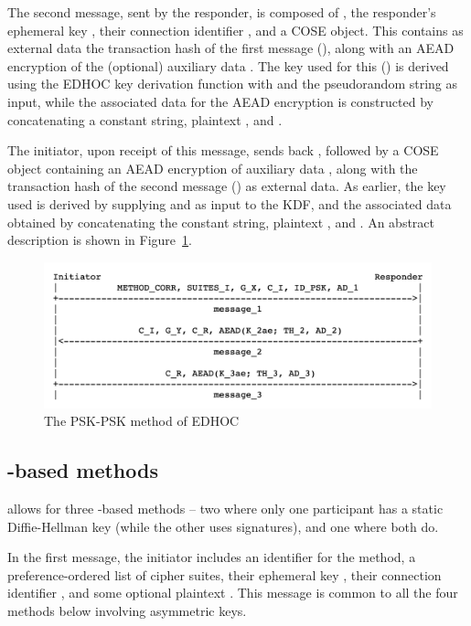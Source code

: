The second message, sent by the responder, is composed of \mCi, the responder's ephemeral key \mGy, their connection identifier \mCr, and a COSE object. This contains as external data the transaction hash of the first message (\mTHtwo), along with an AEAD encryption of the (optional) auxiliary data \mADtwo. The key used for this (\mKtwo) is derived using the EDHOC key derivation function with \mTHtwo and the pseudorandom string \mPRKtwo as input, while the associated data for the AEAD encryption is constructed by concatenating a constant string, plaintext \mhplain, and \mTHtwo. 

The initiator, upon receipt of this message, sends back \mCr, followed by a COSE object containing an AEAD encryption of auxiliary data \mADthree, along with the transaction hash of the second message (\mTHthree) as external data. As earlier, the key used is derived by supplying \mTHthree and \mPRKthree as input to the KDF, and the associated data obtained by concatenating the constant string, plaintext \mhplain, and \mTHthree. An abstract description is shown in Figure~\ref{fig:edhocpsk}.


\begin{figure}[!h]\label{fig:edhocpsk}
\centering
\includegraphics[scale=0.3]{Images/psk.png}
\caption{The PSK-PSK method of EDHOC}
\end{figure}

\subsection{\mStat-based methods}
\mEdhoc allows for three \mStat-based methods -- two where only one participant has a static Diffie-Hellman key (while the other uses signatures), and one where both do. 

In the first message, the initiator includes an identifier for the method, a preference-ordered list of cipher suites, their ephemeral key \mGx, their connection identifier \mCi, and some optional plaintext \mADone. This message is common to all the four methods below involving asymmetric keys. 


